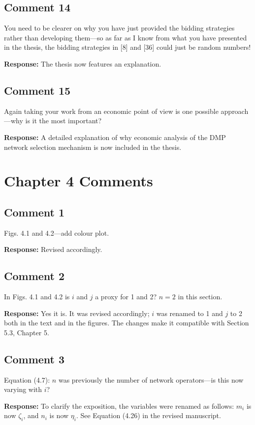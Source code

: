 \documentclass[10pt,a4paper,notitlepage]{article}
\numberwithin{equation}{section}
\begin{document}
\subsection{Comment 14}
You need to be clearer on why you have just provided the bidding strategies rather than developing them---so as far as I know from what you have presented in the thesis, the bidding strategies in [8] and [36] could just be random numbers!

\textbf{Response:}
The thesis now features an explanation.

\subsection{Comment 15}
Again taking your work from an economic point of view is one possible approach---why is it the most important?

\textbf{Response:}
A detailed explanation of why economic analysis of the DMP network selection mechanism is now included in the thesis.

\clearpage

\section{Chapter 4 Comments}
\subsection{Comment 1}
Figs. 4.1 and 4.2---add colour plot.

\textbf{Response:}
Revised accordingly.

\subsection{Comment 2}
In Figs. 4.1 and 4.2 is $i$ and $j$ a proxy for 1 and 2? $n=2$ in this section.

\textbf{Response:}
Yes it is. It was revised accordingly; $i$ was renamed to 1 and $j$ to 2 both in the text and in the figures. The changes make it compatible with Section 5.3, Chapter 5.

\subsection{Comment 3}
Equation (4.7): $n$ was previously the number of network operators---is this now varying with $i$?

\textbf{Response:}
To clarify the exposition, the variables were renamed as follows: $m_i$ is now $\zeta_i$, and $n_i$ is now $\eta_i$. See Equation (4.26) in the revised manuscript.
\end{document}
